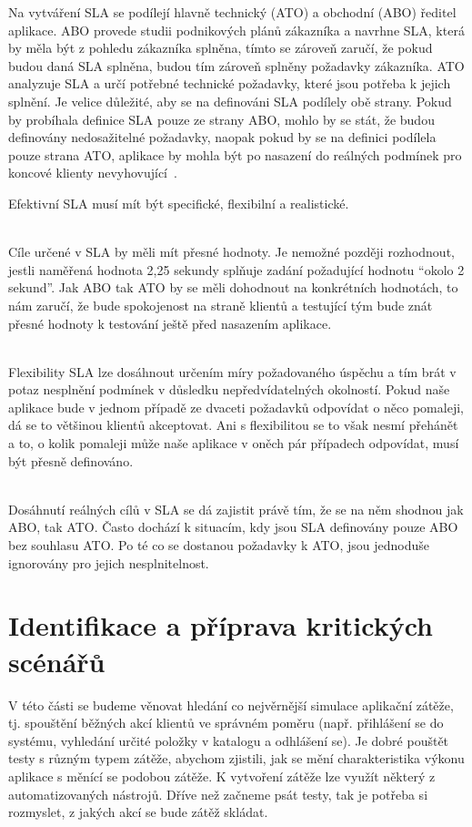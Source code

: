 \documentclass[122pt,oneside]{fithesis}
\begin{document}
Na vytváření SLA se podílejí hlavně technický (ATO) a obchodní (ABO) ředitel aplikace. ABO provede studii podnikových plánů zákazníka a navrhne SLA, která by měla být z pohledu zákazníka splněna, tímto se zároveň zaručí, že pokud budou daná SLA splněna, budou tím zároveň splněny požadavky zákazníka. ATO analyzuje SLA a určí potřebné technické požadavky, které jsou potřeba k jejich splnění. Je velice důležité, aby se na definováni SLA podílely obě strany. Pokud by probíhala definice SLA pouze ze strany ABO, mohlo by se stát, že budou definovány nedosažitelné požadavky, naopak pokud by se na definici podílela pouze strana ATO, aplikace by mohla být po nasazení do reálných podmínek pro koncové klienty nevyhovující~\cite{haines06}.

Efektivní SLA musí mít být specifické, flexibilní a realistické.

\vspace{5 mm}
\\\indent Cíle určené v SLA by měli mít přesné hodnoty. Je nemožné později rozhodnout, jestli naměřená hodnota 2,25 sekundy splňuje zadání požadující hodnotu “okolo 2 sekund”. Jak ABO tak ATO by se měli dohodnout na konkrétních hodnotách, to nám zaručí, že bude spokojenost na straně klientů a testující tým bude znát přesné hodnoty k testování ještě před nasazením aplikace.

\vspace{5 mm}
\\\indent Flexibility SLA lze dosáhnout určením míry požadovaného úspěchu a tím brát v potaz nesplnění podmínek v důsledku nepředvídatelných okolností. Pokud naše aplikace bude v jednom případě ze dvaceti požadavků odpovídat o něco pomaleji, dá se to většinou klientů akceptovat. Ani s flexibilitou se to však nesmí přehánět a to, o kolik pomaleji může naše aplikace v oněch pár případech odpovídat, musí být přesně definováno.

\vspace{5 mm}
\\\indent Dosáhnutí reálných cílů v SLA se dá zajistit právě tím, že se na něm shodnou jak ABO, tak ATO. Často dochází k situacím, kdy jsou SLA definovány pouze ABO bez souhlasu ATO. Po té co se dostanou požadavky k ATO, jsou jednoduše ignorovány pro jejich nesplnitelnost.


\section{Identifikace a příprava kritických scénářů}
V této části se budeme věnovat hledání co nejvěrnější simulace aplikační zátěže, tj. spouštění běžných akcí klientů ve správném poměru (např. přihlášení se do systému, vyhledání určité položky v katalogu a odhlášení se). Je dobré pouštět testy s různým typem zátěže, abychom zjistili, jak se mění charakteristika výkonu aplikace s měnící se podobou zátěže. K vytvoření zátěže lze využít některý z automatizovaných nástrojů. Dříve než začneme psát testy, tak je potřeba si rozmyslet, z jakých akcí se bude zátěž skládat.
\end{document}
